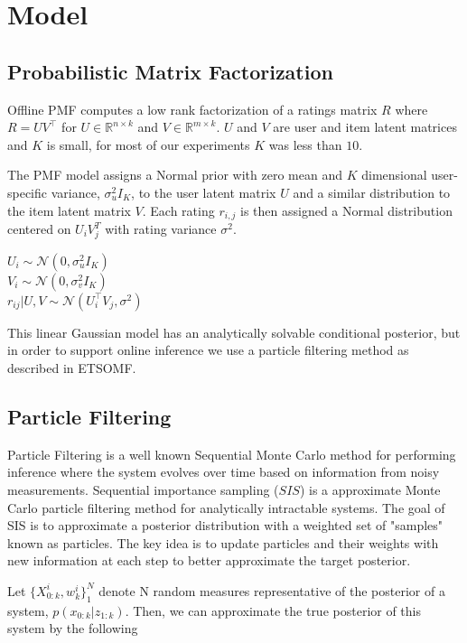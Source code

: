 \documentclass{article}
\begin{document}
\section{Model}

\subsection{Probabilistic Matrix Factorization}
Offline PMF computes a low rank factorization of a ratings matrix $R$ where $R = UV^\top$ for $U \in \mathbb{R}^{n \times k}$
and $V \in \mathbb{R}^{m \times k}$. $U$ and $V$ are user and item latent matrices and $K$ is small, for most of our experiments $K$ was less than $10$.

The PMF model assigns a Normal prior with zero mean and $K$ dimensional user-specific variance, $\sigma_u^2 I_K$, to the user latent matrix $U$ and a similar distribution to the item latent matrix $V$. Each rating $r_{i,j}$ is then assigned a Normal distribution centered on $U_iV_j^T$ with rating variance $\sigma^2$.

\begin{center}
$U_i \sim \mathcal{N}(0, \sigma_u^2 I_K)$ \\
$V_i \sim \mathcal{N}(0, \sigma_v^2 I_K)$ \\
$r_{ij} | U, V \sim \mathcal{N}(U_i^\top V_j, \sigma^2)$
\end{center}

This linear Gaussian model has an analytically solvable conditional posterior, but in order to support online inference we use a particle filtering method as described in ETSOMF.

\subsection{Particle Filtering}
Particle Filtering is a well known Sequential Monte Carlo method for performing inference where the system evolves over time based on information from noisy measurements. Sequential importance sampling ($SIS$) is a approximate Monte Carlo particle filtering method for analytically intractable systems. The goal of SIS is to approximate a posterior distribution with a weighted set of "samples" known as particles. The key idea is to update particles and their weights with new information at each step to better approximate the target posterior.  

Let $\{X_{0:k}^i, w_k^i\}_1^N$ denote N random measures representative of the posterior of a system, $p(x_{0:k}| z_{1:k})$. Then, we can approximate the true posterior of this system by the following
\end{document}

